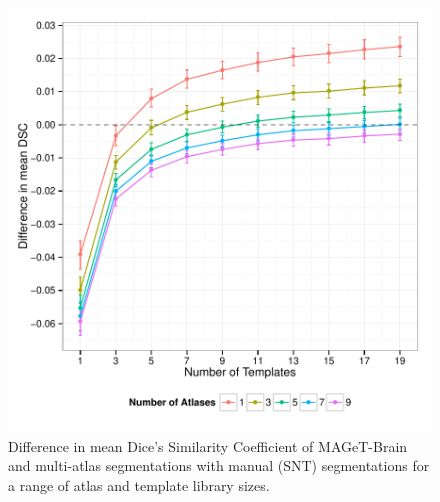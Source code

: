 \documentclass{article}\usepackage{graphicx, color}
\makeatletter
\def\maxwidth{ %
  \ifdim\Gin@nat@width>\linewidth
    \linewidth
  \else
    \Gin@nat@width
  \fi
}
\newenvironment{knitrout}{}{} %
\newcommand{\mb}{MAGeT-Brain }
\makeatother
\begin{document}
\begin{figure}
\begin{knitrout}
\color{fgcolor}

{\centering \includegraphics[width=\maxwidth]{figure/fig_ADN11-xval-k-diff} 

}



\end{knitrout}

  \caption{Difference in mean Dice's Similarity Coefficient of \mb and
  multi-atlas segmentations with manual (SNT) segmentations for a range of atlas
  and template library sizes. \label{fig:ADNI1-xval-k-diff}}
\end{figure}
\end{document}
